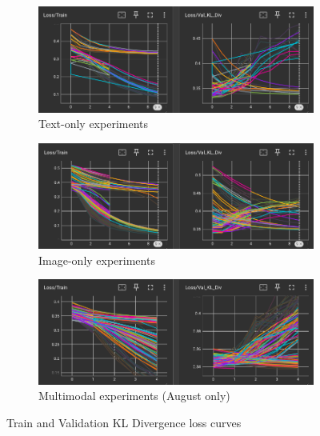 \documentclass[a4paper,oneside,bibliography=totoc]{scrbook}
\begin{document}
\begin{figure}[h]
    \centering
    \begin{subfigure}[b]{0.7\textwidth}
        \centering
        \includegraphics[width=\textwidth]{images/only-text-loss.png}
        \caption{Text-only experiments}
        \label{fig:text-loss}
    \end{subfigure}
    
    \begin{subfigure}[b]{0.7\textwidth}
        \centering
        \includegraphics[width=\textwidth]{images/only-clip-loss.png}
        \caption{Image-only experiments}
        \label{fig:image-loss}
    \end{subfigure}
    
    \begin{subfigure}[b]{0.7\textwidth}
        \centering
        \includegraphics[width=\textwidth]{images/multi-loss.png}
        \caption{Multimodal experiments (August only)}
        \label{fig:multi-loss}
    \end{subfigure}
    
    \caption{Train and Validation KL Divergence loss curves}
    \label{fig:loss-all}
\end{figure}
\end{document}
